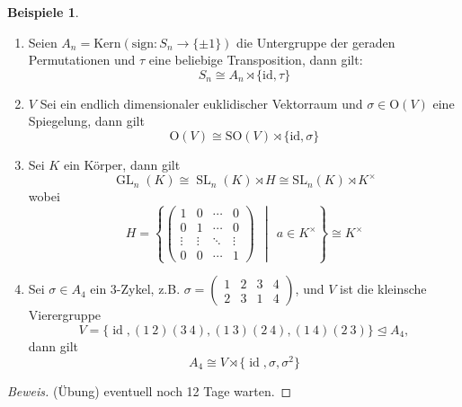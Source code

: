 \documentclass[a4paper]{report}
\theoremstyle{plain}
\theoremstyle{definition}
\newtheorem*{bspe*}{Beispiele}
\DeclareMathOperator{\id}{id}
\DeclareMathOperator{\GL}{GL}
\DeclareMathOperator{\SL}{SL}
\begin{document}
\begin{bspe*}\item
  \begin{enumerate}[1.]
    \item Seien $A_{n} = \mathrm{Kern}(\mathrm{sign}: S_{n} \to \{\pm1\})$ die Untergruppe der geraden Permutationen und $\tau$ eine beliebige Transposition, dann gilt:
          $$S_{n} \cong A_{n} \rtimes \{\mathrm{id}, \tau\}$$
    \item $V$ Sei ein endlich dimensionaler euklidischer Vektorraum und $\sigma \in \mathrm{O}(V)$ eine Spiegelung, dann gilt
          $$\mathrm O(V) \cong \mathrm{SO}(V) \rtimes \{\mathrm{id}, \sigma\}$$
    \item Sei $K$ ein Körper, dann gilt
          $$\GL_{n}(K) \cong \SL_{n}(K) \rtimes H \cong \mathrm{SL}_{n}(K) \rtimes K^{\times}$$
          wobei
          \[H = \left\{ \begin{pmatrix}
                          1 &0&\cdots& 0 \\
                          0 & 1&\cdots & 0\\
                          \vdots &\vdots & \ddots& \vdots\\
                          0 & 0& \cdots& 1
                        \end{pmatrix} \ \ \middle\vert\ \  a \in K^{\times}\right\} \cong K^{\times}
          \]
    \item Sei $\sigma \in A_{4}$ ein 3-Zykel, z.B. $\sigma = \begin{pmatrix} 1 & 2 & 3 & 4 \\ 2 & 3 & 1 & 4 \end{pmatrix}$, und $V$ ist die kleinsche Vierergruppe
          $$V = \{\id, (1\ 2)(3\ 4), (1\ 3)(2\ 4), (1\ 4)(2\ 3)\} \trianglelefteq A_{4},$$
          dann gilt $$A_{4} \cong V \rtimes \{\id, \sigma, \sigma^{2}\}$$
  \end{enumerate}
  \begin{proof}[Beweis] (Übung) eventuell noch 12 Tage warten.
  \end{proof}
\end{bspe*}
\end{document}
